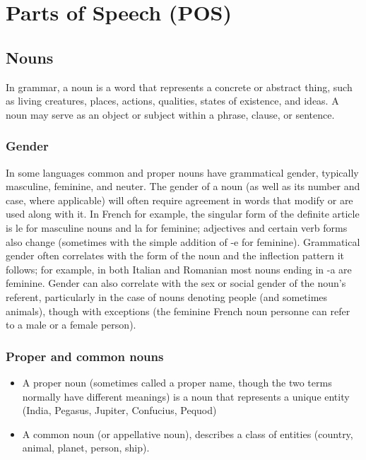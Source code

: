 \section{Parts of Speech (POS)}\label{Parts of Speech (POS)}

\subsection{Nouns \cite{wiki-noun}}
In grammar, a noun is a word that represents a concrete or abstract thing, such as living creatures, places, actions, qualities, states of existence, and ideas. A noun may serve as an object or subject within a phrase, clause, or sentence.
\subsubsection{Gender \cite{wiki-noun}}
In some languages common and proper nouns have grammatical gender, typically masculine, feminine, and neuter. The gender of a noun (as well as its number and case, where applicable) will often require agreement in words that modify or are used along with it. In French for example, the singular form of the definite article is le for masculine nouns and la for feminine; adjectives and certain verb forms also change (sometimes with the simple addition of -e for feminine). Grammatical gender often correlates with the form of the noun and the inflection pattern it follows; for example, in both Italian and Romanian most nouns ending in -a are feminine. Gender can also correlate with the sex or social gender of the noun's referent, particularly in the case of nouns denoting people (and sometimes animals), though with exceptions (the feminine French noun personne can refer to a male or a female person).

\subsubsection{Proper and common nouns \cite{wiki-noun}}
\begin{itemize}
    \item A proper noun (sometimes called a proper name, though the two terms normally have different meanings) is a noun that represents a unique entity (India, Pegasus, Jupiter, Confucius, Pequod)
    \item A common noun (or appellative noun), describes a class of entities (country, animal, planet, person, ship).
\end{itemize}


